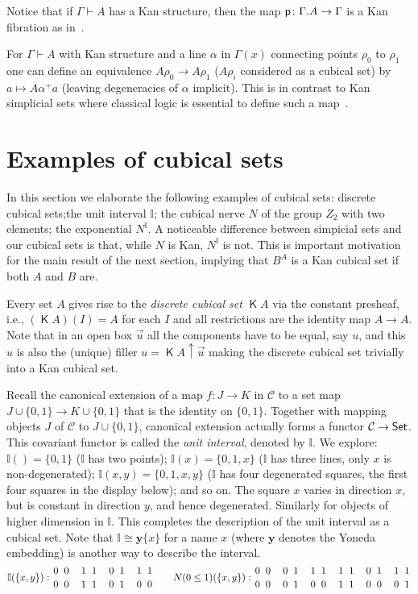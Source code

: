 \documentclass[10pt,a4paper]{article}
\newcommand{\CC}{{\mathcal C}}
\newcommand{\pp}{{\sf p}}
\newcommand{\set}[1]{\{#1\}}
\newcommand{\rup}[1]{#1{\uparrow}}
\newcommand{\yoneda}{\mathbf{y}}
\newcommand{\interval}{\mathbb{I}}
\DeclareMathOperator{\discr}{\mathsf{K}}
\begin{document}
Notice that if $\Gamma \vdash A$ has a Kan structure, then the map
$\pp \colon \Gamma.A \to \Gamma$ is a Kan fibration as in~\cite{Kan,
  Williamson}.

For $\Gamma \vdash A$ with Kan structure and a line $\alpha$ in
$\Gamma (x)$ connecting points $\rho_0$ to $\rho_1$ one can define an
equivalence $A \rho_0 \to A \rho_1$ ($A\rho_i$ considered as a cubical
set) by $a \mapsto A \alpha^+ a$ (leaving degeneracies of $\alpha$
implicit).  This is in contrast to Kan simplicial sets where classical
logic is essential to define such a map~\cite{BC}.


\section{Examples of cubical sets}\label{sec:examples}
In this section we elaborate the following examples of cubical sets:
discrete cubical sets;the unit interval $\interval$; the cubical nerve
$N$ of the group $Z_2$ with two elements; the exponential
$N^\interval$.  A noticeable difference between simpicial sets and our
cubical sets is that, while $N$ is Kan, $N^\interval$ is not.  This is
important motivation for the main result of the next section, implying
that $B^A$ is a Kan cubical set if both $A$ and $B$ are.

Every set $A$ gives rise to the \emph{discrete cubical set} $\discr A$
via the constant presheaf, i.e., $(\discr A) (I) = A$ for each $I$ and
all restrictions are the identity map $A \to A$.  Note that in an open
box $\vec u$ all the components have to be equal, say $u$, and this
$u$ is also the (unique) filler $u = \rup {\discr A} {\vec u}$ making
the discrete cubical set trivially into a Kan cubical set.

Recall the canonical extension of a map $f:J\to K$ in $\CC$ to a set
map $J \cup \set{0,1} \to K\cup \set{0,1}$ that is the identity on
$\set{0,1}$.  Together with mapping objects $J$ of $\CC$ to $J \cup
\set{0,1}$, canonical extension actually forms a functor $\CC\to{\sf
  Set}$.  This covariant functor is called the \emph{unit interval},
denoted by $\interval$.  We explore: $\interval()=\set{0,1}$
($\interval$ has two points); $\interval(x)=\set{0,1,x}$ ($\interval$
has three lines, only $x$ is non-degenerated); $\interval(x,y) =
\set{0,1,x,y}$ ($\interval$ has four degenerated squares, the first
four squares in the display below); and so on.  The square $x$ varies
in direction $x$, but is constant in direction $y$, and hence
degenerated.  Similarly for objects of higher dimension in
$\interval$.  This completes the description of the unit interval as a
cubical set.  Note that $\interval \cong \yoneda \set{x}$ for a name
$x$ (where $\yoneda$ denotes the Yoneda embedding) is another way to
describe the interval.
\[
\def\olll{{1 \atop 0} ~ {1 \atop 1}}
\def\oool{{0 \atop 0} ~ {1 \atop 0}}
\def\oooo{{0 \atop 0} ~ {0 \atop 0}}
\def\llll{{1 \atop 1} ~ {1 \atop 1}}
\def\olol{{1 \atop 0} ~ {1 \atop 0}}
\def\ooll{{0 \atop 0} ~ {1 \atop 1}}
\def\Fxy{{0 \atop 0} ~ {0 \atop 0}}
\def\Txy{{1 \atop 1} ~ {1 \atop 1}}
\def\Iy{{1 \atop 0} ~ {1 \atop 0}}
\def\Ix{{0 \atop 0} ~ {1 \atop 1}}
\interval(\set{x,y}):\Fxy\quad\Txy\quad\Ix\quad\Iy\quad\quad
N(0\leq1)(\set{x,y}):\oooo\quad\ooll\quad\olol\quad\llll\quad\oool\quad\olll\]
\end{document}
